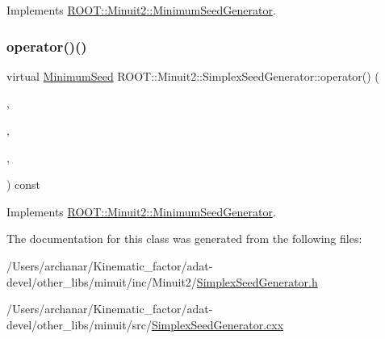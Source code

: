 Implements \mbox{\hyperlink{classROOT_1_1Minuit2_1_1MinimumSeedGenerator_a670b9671c73d7e0d3caa148e82d4b2fa}{R\+O\+O\+T\+::\+Minuit2\+::\+Minimum\+Seed\+Generator}}.

\mbox{\label{classROOT_1_1Minuit2_1_1SimplexSeedGenerator_a483dc9272be849a23bcd0d29ac4e3b94}} 
\subsubsection{\texorpdfstring{operator()()}{operator()()}\hspace{0.1cm}{\footnotesize\ttfamily [6/6]}}
{\footnotesize\ttfamily virtual \mbox{\hyperlink{classROOT_1_1Minuit2_1_1MinimumSeed}{Minimum\+Seed}} R\+O\+O\+T\+::\+Minuit2\+::\+Simplex\+Seed\+Generator\+::operator() (\begin{DoxyParamCaption}\item[{const \mbox{\hyperlink{classROOT_1_1Minuit2_1_1MnFcn}{Mn\+Fcn}} \&}]{,  }\item[{const \mbox{\hyperlink{classROOT_1_1Minuit2_1_1AnalyticalGradientCalculator}{Analytical\+Gradient\+Calculator}} \&}]{,  }\item[{const \mbox{\hyperlink{classROOT_1_1Minuit2_1_1MnUserParameterState}{Mn\+User\+Parameter\+State}} \&}]{,  }\item[{const \mbox{\hyperlink{classROOT_1_1Minuit2_1_1MnStrategy}{Mn\+Strategy}} \&}]{ }\end{DoxyParamCaption}) const\hspace{0.3cm}{\ttfamily [virtual]}}



Implements \mbox{\hyperlink{classROOT_1_1Minuit2_1_1MinimumSeedGenerator_a670b9671c73d7e0d3caa148e82d4b2fa}{R\+O\+O\+T\+::\+Minuit2\+::\+Minimum\+Seed\+Generator}}.



The documentation for this class was generated from the following files\+:\begin{DoxyCompactItemize}
\item 
/\+Users/archanar/\+Kinematic\+\_\+factor/adat-\/devel/other\+\_\+libs/minuit/inc/\+Minuit2/\mbox{\hyperlink{adat-devel_2other__libs_2minuit_2inc_2Minuit2_2SimplexSeedGenerator_8h}{Simplex\+Seed\+Generator.\+h}}\item 
/\+Users/archanar/\+Kinematic\+\_\+factor/adat-\/devel/other\+\_\+libs/minuit/src/\mbox{\hyperlink{adat-devel_2other__libs_2minuit_2src_2SimplexSeedGenerator_8cxx}{Simplex\+Seed\+Generator.\+cxx}}\end{DoxyCompactItemize}
